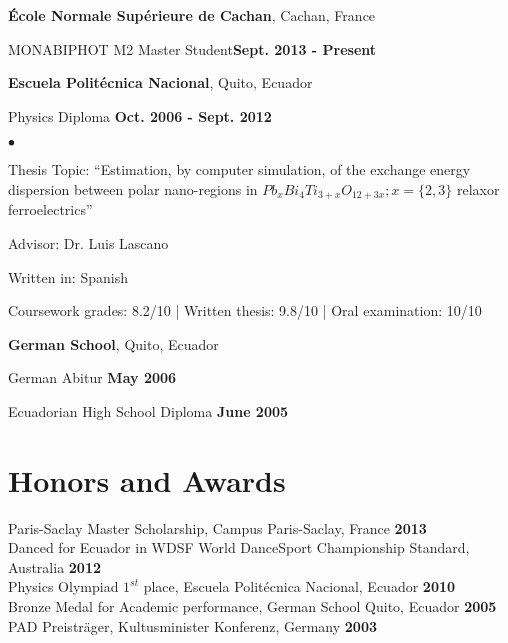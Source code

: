 \documentclass[margin,line]{res}
\newenvironment{list1}{
  \begin{list}{\ding{113}}{%
      \setlength{\itemsep}{0in}
      \setlength{\parsep}{0in} \setlength{\parskip}{0in}
      \setlength{\topsep}{0in} \setlength{\partopsep}{0in} 
      \setlength{\leftmargin}{0.17in}}}{\end{list}}
\newenvironment{list2}{
  \begin{list}{$\bullet$}{%
      \setlength{\itemsep}{0in}
      \setlength{\parsep}{0in} \setlength{\parskip}{0in}
      \setlength{\topsep}{0in} \setlength{\partopsep}{0in} 
      \setlength{\leftmargin}{0.2in}}}{\end{list}}
\begin{document}
\begin{resume}
  {\bf École Normale Supérieure de Cachan}, Cachan, France\\
  \vspace{-.1in}
  \begin{list1}
    \item[] MONABIPHOT M2 Master Student\hfill {\bf Sept. 2013 - Present}
  \end{list1}

  {\bf Escuela Politécnica Nacional}, Quito, Ecuador\\
  \vspace{-.1in}
  \begin{list1}
    \item[] Physics Diploma \hfill {\bf Oct. 2006 - Sept. 2012}\\
    \begin{list2}
    \vspace{-.1in}
      \item Thesis Topic:  ``Estimation, by computer simulation, of the exchange
	energy dispersion between polar nano-regions in $Pb_xBi_4Ti_{3+x}O_{12+3x}; x=\{2,3\}$
	relaxor ferroelectrics''
      \item Advisor: Dr. Luis Lascano
      \item Written in: Spanish
      \item Coursework grades: 8.2/10 | Written thesis: 9.8/10 | Oral examination: 10/10
    \end{list2}
  \end{list1}

  {\bf German School}, Quito, Ecuador\\
  \vspace{-.1in}
  \begin{list1}
    \item[] German Abitur \hfill {\bf May 2006}
    \item[] Ecuadorian High School Diploma \hfill {\bf June 2005}
  \end{list1}

\section{\sc Honors and Awards}
  Paris-Saclay Master Scholarship, Campus Paris-Saclay, France \hfill {\bf
2013}\\
  Danced for Ecuador in WDSF World DanceSport Championship Standard, Australia \hfill {\bf 2012}\\
  Physics Olympiad $1^{st}$ place, Escuela Politécnica Nacional, Ecuador \hfill {\bf 2010}\\
  Bronze Medal for Academic performance, German School Quito, Ecuador \hfill {\bf 2005}\\
  PAD Preisträger, Kultusminister Konferenz, Germany \hfill {\bf 2003}


\end{resume}
\end{document}
